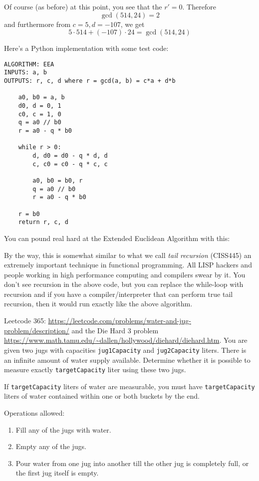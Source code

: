 Of course (as before) at this point, you see that the $r'=0$.
Therefore 
\[
\gcd(514, 24) = 2
\]
and furthermore from $c=5, d=-107$, we get
\[
5 \cdot 514 + (-107) \cdot 24 = \gcd(514, 24) 
\]

Here's a Python implementation with some test code:
\begin{Verbatim}[frame=single, fontsize=\small]
ALGORITHM: EEA
INPUTS: a, b
OUTPUTS: r, c, d where r = gcd(a, b) = c*a + d*b

    a0, b0 = a, b
    d0, d = 0, 1
    c0, c = 1, 0
    q = a0 // b0
    r = a0 - q * b0
    
    while r > 0:
        d, d0 = d0 - q * d, d    
        c, c0 = c0 - q * c, c
    
        a0, b0 = b0, r
        q = a0 // b0
        r = a0 - q * b0

    r = b0
    return r, c, d
\end{Verbatim}
You can pound real hard at the Extended Euclidean Algorithm with this:

By the way, this is somewhat similar to what we call
\textit{tail recursion} (CISS445)
an extremely important technique in functional programming.
All LISP hackers and people working in high performance computing
and compilers swear by it.
You don't see recursion in the above code, but you can 
replace the while-loop with recursion and if
you have a compiler/interpreter that can perform 
true tail recursion, then it would run exactly like the above algorithm.

\begin{ex}
  Leetcode 365:
  \url{https://leetcode.com/problems/water-and-jug-problem/description/}
  and the Die Hard 3 problem
  \url{https://www.math.tamu.edu/~dallen/hollywood/diehard/diehard.htm}.
  You are given two jugs with capacities \verb!jug1Capacity! and
  \verb!jug2Capacity! liters.
  There is an infinite amount of water supply available.
  Determine whether it is possible to measure exactly \verb!targetCapacity!
  liter using these two jugs.

  If \verb!targetCapacity! liters of water are measurable,
  you must have \verb!targetCapacity! liters of water contained within one or
  both buckets by the end.

  Operations allowed:
  \begin{enumerate}[nosep]
    \item Fill any of the jugs with water.
    \item Empty any of the jugs.
    \item Pour water from one jug into another till the other jug is completely
      full, or the first jug itself is empty.
  \end{enumerate}
  
\end{ex}

